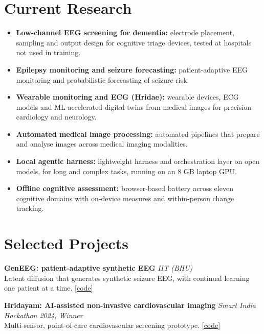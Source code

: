 \documentclass[10pt,a4paper]{article}
\newcommand{\project}[3]{
  \noindent\textbf{#1} \hfill \textit{\small #2} \\
  {\small #3} \par
  \vspace{4pt}
}
\begin{document}
\section{Current Research}
\begin{itemize}
    \item \textbf{Low-channel EEG screening for dementia:} electrode placement, sampling and output design for cognitive triage devices, tested at hospitals not used in training.
    \item \textbf{Epilepsy monitoring and seizure forecasting:} patient-adaptive EEG monitoring and probabilistic forecasting of seizure risk.
    \item \textbf{Wearable monitoring and ECG (Hridae):} wearable devices, ECG models and ML-accelerated digital twins from medical images for precision cardiology and neurology.
    \item \textbf{Automated medical image processing:} automated pipelines that prepare and analyse images across medical imaging modalities.
    \item \textbf{Local agentic harness:} lightweight harness and orchestration layer on open models, for long and complex tasks, running on an 8 GB laptop GPU.
    \item \textbf{Offline cognitive assessment:} browser-based battery across eleven cognitive domains with on-device measures and within-person change tracking.
\end{itemize}

\vspace{6pt}

\vspace{6pt}

\section{Selected Projects}
\project{GenEEG: patient-adaptive synthetic EEG}{IIT (BHU)}
{Latent diffusion that generates synthetic seizure EEG, with continual learning one patient at a time. \href{https://github.com/soinikghosh9/GenEEG}{[code]}}

\project{Hridayam: AI-assisted non-invasive cardiovascular imaging}{Smart India Hackathon 2024, Winner}
{Multi-sensor, point-of-care cardiovascular screening prototype. \href{https://github.com/soinikghosh9/Hridayam}{[code]}}
\end{document}
